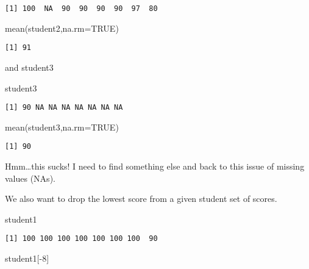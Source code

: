 \documentclass[
  letterpaper,
  DIV=11,
  numbers=noendperiod]{scrartcl}
\newenvironment{Shaded}{\begin{snugshade}}{\end{snugshade}}
\newcommand{\AttributeTok}[1]{\textcolor[rgb]{0.40,0.45,0.13}{#1}}
\newcommand{\ConstantTok}[1]{\textcolor[rgb]{0.56,0.35,0.01}{#1}}
\newcommand{\DecValTok}[1]{\textcolor[rgb]{0.68,0.00,0.00}{#1}}
\newcommand{\FunctionTok}[1]{\textcolor[rgb]{0.28,0.35,0.67}{#1}}
\newcommand{\NormalTok}[1]{\textcolor[rgb]{0.00,0.23,0.31}{#1}}
\newcommand{\SpecialCharTok}[1]{\textcolor[rgb]{0.37,0.37,0.37}{#1}}
\begin{document}
\begin{verbatim}
[1] 100  NA  90  90  90  90  97  80
\end{verbatim}

\begin{Shaded}
\begin{Highlighting}[]
\FunctionTok{mean}\NormalTok{(student2,}\AttributeTok{na.rm=}\ConstantTok{TRUE}\NormalTok{)}
\end{Highlighting}
\end{Shaded}

\begin{verbatim}
[1] 91
\end{verbatim}

and student3

\begin{Shaded}
\begin{Highlighting}[]
\NormalTok{student3}
\end{Highlighting}
\end{Shaded}

\begin{verbatim}
[1] 90 NA NA NA NA NA NA NA
\end{verbatim}

\begin{Shaded}
\begin{Highlighting}[]
\FunctionTok{mean}\NormalTok{(student3,}\AttributeTok{na.rm=}\ConstantTok{TRUE}\NormalTok{)}
\end{Highlighting}
\end{Shaded}

\begin{verbatim}
[1] 90
\end{verbatim}

Hmm\ldots this sucks! I need to find something else and back to this
issue of missing values (NAs).

We also want to drop the lowest score from a given student set of
scores.

\begin{Shaded}
\begin{Highlighting}[]
\NormalTok{student1}
\end{Highlighting}
\end{Shaded}

\begin{verbatim}
[1] 100 100 100 100 100 100 100  90
\end{verbatim}

\begin{Shaded}
\begin{Highlighting}[]
\NormalTok{student1[}\SpecialCharTok{{-}}\DecValTok{8}\NormalTok{]}
\end{Highlighting}
\end{Shaded}
\end{document}

